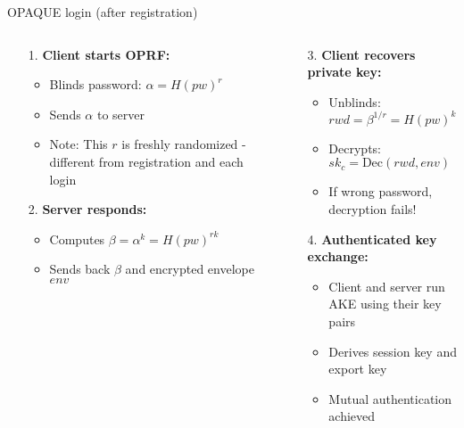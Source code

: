 \documentclass[aspectratio=169, lualatex, handout]{beamer}
\begin{document}
\begin{frame}{OPAQUE login (after registration)}
	\begin{columns}[c]
		\begin{column}{0.5\textwidth}
			\begin{itemize}
				\item[1.]\textbf{Client starts OPRF:}
				\begin{itemize}
					\item Blinds password: $\alpha = H(pw)^r$
					\item Sends $\alpha$ to server
					\item Note: This $r$ is freshly randomized - different from registration and each login
				\end{itemize}
				\item[2.]\textbf{Server responds:}
				\begin{itemize}
					\item Computes $\beta = \alpha^k = H(pw)^{rk}$
					\item Sends back $\beta$ and encrypted envelope $env$
				\end{itemize}
			\end{itemize}
		\end{column}
		\begin{column}{0.5\textwidth}
			\begin{itemize}
				\item[3.]\textbf{Client recovers private key:}
				\begin{itemize}
					\item Unblinds: $rwd = \beta^{1/r} = H(pw)^k$
					\item Decrypts: $sk_c = \text{Dec}(rwd, env)$
					\item If wrong password, decryption fails!
				\end{itemize}
				\item[4.]\textbf{Authenticated key exchange:}
				\begin{itemize}
					\item Client and server run AKE using their key pairs
					\item Derives session key and export key
					\item Mutual authentication achieved
				\end{itemize}
			\end{itemize}
		\end{column}
	\end{columns}
\end{frame}
\end{document}
